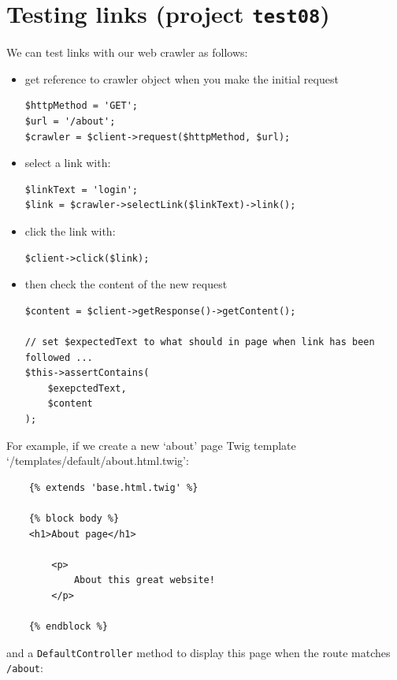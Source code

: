\documentclass[a4paperpaper,openright]{book}
\begin{document}
\hypertarget{testing-links-project-test08}{%
\section{\texorpdfstring{Testing links (project
\texttt{test08})}{Testing links (project test08)}}\label{testing-links-project-test08}}

We can test links with our web crawler as follows:

\begin{itemize}
\item
  get reference to crawler object when you make the initial request

\begin{verbatim}
$httpMethod = 'GET';
$url = '/about';
$crawler = $client->request($httpMethod, $url);
\end{verbatim}
\item
  select a link with:

\begin{verbatim}
$linkText = 'login';
$link = $crawler->selectLink($linkText)->link();
\end{verbatim}
\item
  click the link with:

\begin{verbatim}
$client->click($link);
\end{verbatim}
\item
  then check the content of the new request

\begin{verbatim}
$content = $client->getResponse()->getContent();

// set $expectedText to what should in page when link has been followed ...
$this->assertContains(
    $exepctedText,
    $content
);
\end{verbatim}
\end{itemize}

For example, if we create a new `about' page Twig template
`/templates/default/about.html.twig':

\begin{verbatim}
    {% extends 'base.html.twig' %}

    {% block body %}
    <h1>About page</h1>

        <p>
            About this great website!
        </p>

    {% endblock %}
\end{verbatim}

and a \texttt{DefaultController} method to display this page when the
route matches \texttt{/about}:
\end{document}
